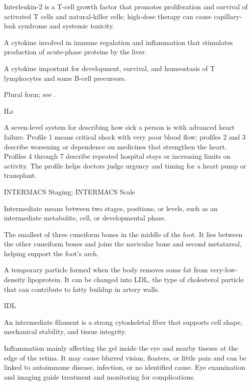  Interleukin-2 is a T-cell growth factor that promotes proliferation and survival of activated T cells and natural-killer cells; high-dose therapy can cause capillary-leak syndrome and systemic toxicity.

 A cytokine involved in immune regulation and inflammation that stimulates production of acute-phase proteins by the liver.

 A cytokine important for development, survival, and homeostasis of T lymphocytes and some B-cell precursors.

 Plural form; see .

\synonyms
ILs

 A seven-level system for describing how sick a person is with advanced heart failure. Profile 1 means critical shock with very poor blood flow; profiles 2 and 3 describe worsening or dependence on medicines that strengthen the heart. Profiles 4 through 7 describe repeated hospital stays or increasing limits on activity. The profile helps doctors judge urgency and timing for a heart pump or transplant.

\synonyms
INTERMACS Staging; INTERMACS Scale

 Intermediate means between two stages, positions, or levels, such as an intermediate metabolite, cell, or developmental phase.

 The smallest of three cuneiform bones in the middle of the foot. It lies between the other cuneiform bones and joins the navicular bone and second metatarsal, helping support the foot’s arch.

 A temporary particle formed when the body removes some fat from very-low-density lipoprotein. It can be changed into LDL, the type of cholesterol particle that can contribute to fatty buildup in artery walls.

\synonyms
IDL

 An intermediate filament is a strong cytoskeletal fiber that supports cell shape, mechanical stability, and tissue integrity.

 Inflammation mainly affecting the gel inside the eye and nearby tissues at the edge of the retina. It may cause blurred vision, floaters, or little pain and can be linked to autoimmune disease, infection, or no identified cause. Eye examination and imaging guide treatment and monitoring for complications.

